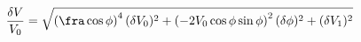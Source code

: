 \begin{equation}
\label{eq:delta_V_Malus}
\frac{\delta V}{V_0} = \sqrt{ \left(\fra\cos{\phi}\right)^4(\delta V_0)^2 + \left(-2 V_0 \cos{\phi}\sin{\phi} \right)^2(\delta \phi)^2+ (\delta V_1)^2}
\end{equation}